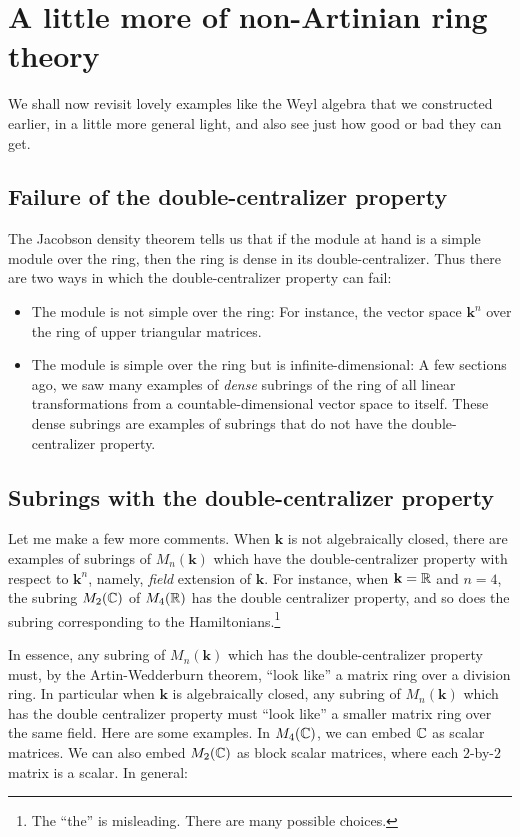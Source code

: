 \documentclass[a4paper]{amsart}
\newcommand{\field}{\mathbf{k}}
\begin{document}
\section{A little more of non-Artinian ring theory}

We shall now revisit lovely examples like the Weyl algebra that we
constructed earlier, in a little more general light, and also see just
how good or bad they can get.

\subsection{Failure of the double-centralizer property}

The Jacobson density theorem tells us that if the module at hand is a
simple module over the ring, then the ring is dense in its
double-centralizer. Thus there are two ways in which the
double-centralizer property can fail:

\begin{itemize}

\item The module is not simple over the ring: For instance, the vector space
  $\field^n$ over the ring of upper triangular matrices.

\item The module is simple over the ring but is infinite-dimensional:
  A few sections ago, we saw many examples of {\em dense} subrings of
  the ring of all linear transformations from a countable-dimensional
  vector space to itself. These dense subrings are examples of
  subrings that do not have the double-centralizer property.

\end{itemize}

\subsection{Subrings with the double-centralizer property}

Let me make a few more comments. When $\field$ is not algebraically
closed, there are examples of subrings of $M_n(\field)$ which have the
double-centralizer property with respect to $\field^n$, namely, {\em
  field} extension of $\field$. For instance, when $\field = \R$ and
$n = 4$, the subring $M_2(\mathbb{C})$ of $M_4(\mathbb{R})$ has the double centralizer
property, and so does the subring corresponding to the
Hamiltonians.\footnote{The ``the'' is misleading. There are many
  possible choices.}

In essence, any subring of $M_n(\field)$ which has the
double-centralizer property must, by the Artin-Wedderburn theorem,
``look like'' a matrix ring over a division ring. In particular when
$\field$ is algebraically closed, any subring of $M_n(\field)$ which
has the double centralizer property must ``look like'' a smaller
matrix ring over the same field. Here are some examples. In $M_4(\mathbb{C})$,
we can embed $\mathbb{C}$ as scalar matrices. We can also embed $M_2(\mathbb{C})$ as
block scalar matrices, where each $2$-by-$2$ matrix is a scalar. In general:
\end{document}
